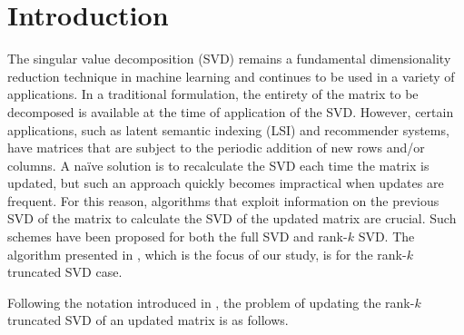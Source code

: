 
\section{Introduction} \label{sec:intro}

The singular value decomposition (SVD) remains a fundamental dimensionality reduction technique in machine learning and continues to be used in a variety of applications.
In a traditional formulation, the entirety of the matrix to be decomposed is available at the time of application of the SVD. However, certain applications, such as latent semantic indexing (LSI) and recommender systems, have matrices that are subject to the periodic addition of new rows and/or columns.
A na\"{i}ve solution is to recalculate the SVD each time the matrix is updated, but such an approach quickly becomes impractical when updates are frequent.
For this reason, algorithms that exploit information on the previous SVD of the matrix to calculate the SVD of the updated matrix are crucial.
Such schemes have been proposed for both the full SVD and rank-$k$ SVD.
The algorithm presented in \cite{Kalantzis2021}, which is the focus of our study, is for the rank-$k$ truncated SVD case.

Following the notation introduced in \cite{Kalantzis2021}, the problem of updating the rank-$k$ truncated SVD of an updated matrix is as follows.

